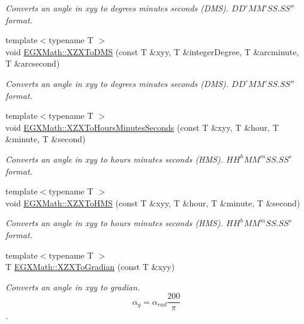 \begin{DoxyCompactItemize}
\begin{DoxyCompactList}\small\item\em Converts an angle in xyy to degrees minutes seconds (D\+MS). ${DD}^{\circ}{MM}'{SS.SS}''$ format. \end{DoxyCompactList}\item 
{\footnotesize template$<$typename T $>$ }\\void \mbox{\hyperlink{group___e_g_x_math-_angle_conversions-_x_z_x_ga115e1f974ad75405c5a6adc880616ef0}{E\+G\+X\+Math\+::\+X\+Z\+X\+To\+D\+MS}} (const T \&xyy, T \&integer\+Degree, T \&arcminute, T \&arcsecond)
\begin{DoxyCompactList}\small\item\em Converts an angle in xyy to degrees minutes seconds (D\+MS). ${DD}^{\circ}{MM}'{SS.SS}''$ format. \end{DoxyCompactList}\item 
{\footnotesize template$<$typename T $>$ }\\void \mbox{\hyperlink{group___e_g_x_math-_angle_conversions-_x_z_x_gad5c6d7c839080043e5f0605a7b7b1ac6}{E\+G\+X\+Math\+::\+X\+Z\+X\+To\+Hours\+Minutes\+Seconds}} (const T \&xyy, T \&hour, T \&minute, T \&second)
\begin{DoxyCompactList}\small\item\em Converts an angle in xyy to hours minutes seconds (H\+MS). ${HH}^h{MM}^m{SS.SS}^s$ format. \end{DoxyCompactList}\item 
{\footnotesize template$<$typename T $>$ }\\void \mbox{\hyperlink{group___e_g_x_math-_angle_conversions-_x_z_x_ga3f52a8fe8ff0da0ebf9f05bb482b6a17}{E\+G\+X\+Math\+::\+X\+Z\+X\+To\+H\+MS}} (const T \&xyy, T \&hour, T \&minute, T \&second)
\begin{DoxyCompactList}\small\item\em Converts an angle in xyy to hours minutes seconds (H\+MS). ${HH}^h{MM}^m{SS.SS}^s$ format. \end{DoxyCompactList}\item 
{\footnotesize template$<$typename T $>$ }\\T \mbox{\hyperlink{group___e_g_x_math-_angle_conversions-_x_z_x_ga91288ab3da9655e8ac1e3db44f9620a4}{E\+G\+X\+Math\+::\+X\+Z\+X\+To\+Gradian}} (const T \&xyy)
\begin{DoxyCompactList}\small\item\em Converts an angle in xyy to gradian. \[\alpha_{g}=\alpha_{rad}\frac{200}{\pi}\]. \end{DoxyCompactList}\item 

\end{DoxyCompactItemize}
